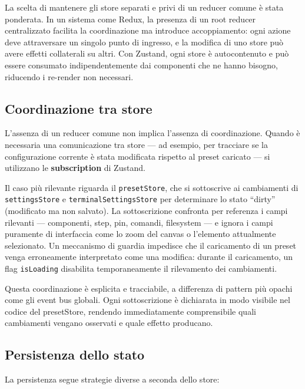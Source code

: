 La scelta di mantenere gli store separati e privi di un reducer comune è stata ponderata. In un sistema come Redux, la presenza di un root reducer centralizzato facilita la coordinazione ma introduce accoppiamento: ogni azione deve attraversare un singolo punto di ingresso, e la modifica di uno store può avere effetti collaterali su altri. Con Zustand, ogni store è autocontenuto e può essere consumato indipendentemente dai componenti che ne hanno bisogno, riducendo i re-render non necessari.

\subsection{Coordinazione tra store}

L'assenza di un reducer comune non implica l'assenza di coordinazione. Quando è necessaria una comunicazione tra store --- ad esempio, per tracciare se la configurazione corrente è stata modificata rispetto al preset caricato --- si utilizzano le \textbf{subscription} di Zustand.

Il caso più rilevante riguarda il \texttt{presetStore}, che si sottoscrive ai cambiamenti di \texttt{settingsStore} e \texttt{terminalSettingsStore} per determinare lo stato ``dirty'' (modificato ma non salvato). La sottoscrizione confronta per referenza i campi rilevanti --- componenti, step, pin, comandi, filesystem --- e ignora i campi puramente di interfaccia come lo zoom del canvas o l'elemento attualmente selezionato. Un meccanismo di guardia impedisce che il caricamento di un preset venga erroneamente interpretato come una modifica: durante il caricamento, un flag \texttt{isLoading} disabilita temporaneamente il rilevamento dei cambiamenti.

Questa coordinazione è esplicita e tracciabile, a differenza di pattern più opachi come gli event bus globali. Ogni sottoscrizione è dichiarata in modo visibile nel codice del presetStore, rendendo immediatamente comprensibile quali cambiamenti vengano osservati e quale effetto producano.

\subsection{Persistenza dello stato}

La persistenza segue strategie diverse a seconda dello store:

